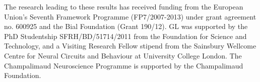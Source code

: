 

\label{contrib}

The research leading to these results has received funding from the European Union's Seventh Framework Programme (FP7/2007-2013) under grant agreement no. 600925 and the Bial Foundation (Grant 190/12). GL was supported by the PhD Studentship SFRH/BD/51714/2011 from the Foundation for Science and Technology, and a Visiting Research Fellow stipend from the Sainsbury Wellcome Centre for Neural Circuits and Behaviour at University College London. The Champalimaud Neuroscience Programme is supported by the Champalimaud Foundation.
